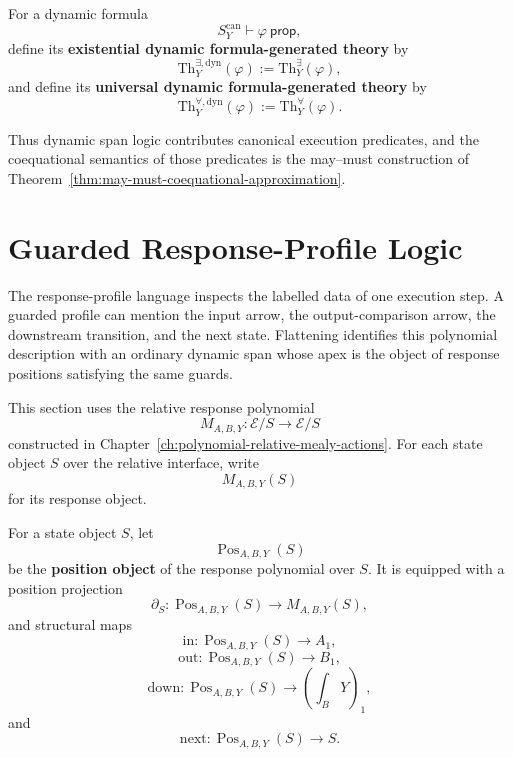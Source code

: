 \begin{definition}
\label{def:dynamic-formula-generated-theories}
For a dynamic formula
\[
  S^{\mathrm{can}}_Y\vdash\varphi\ \mathsf{prop},
\]
define its \textbf{existential dynamic formula-generated theory} by
\[
  \mathrm{Th}^{\exists,\mathrm{dyn}}_Y(\varphi)
  :=
  \mathrm{Th}^{\exists}_Y(\varphi),
\]
and define its \textbf{universal dynamic formula-generated theory} by
\[
  \mathrm{Th}^{\forall,\mathrm{dyn}}_Y(\varphi)
  :=
  \mathrm{Th}^{\forall}_Y(\varphi).
\]
\end{definition}

Thus dynamic span logic contributes canonical execution predicates, and the
coequational semantics of those predicates is the may--must construction of
Theorem~\ref{thm:may-must-coequational-approximation}.

\section{Guarded Response-Profile Logic}
\label{sec:guarded-response-profile-logic-formal}

The response-profile language inspects the labelled data of one execution
step.  A guarded profile can mention the input arrow, the output-comparison
arrow, the downstream transition, and the next state.  Flattening identifies
this polynomial description with an ordinary dynamic span whose apex is the
object of response positions satisfying the same guards.

This section uses the relative response polynomial
\[
  M_{A,B,Y}:\mathcal E/S\to \mathcal E/S
\]
constructed in Chapter~\ref{ch:polynomial-relative-mealy-actions}.  For each
state object \(S\) over the relative interface, write
\[
  M_{A,B,Y}(S)
\]
for its response object.

\begin{definition}
\label{def:response-positions}
For a state object \(S\), let
\[
  \operatorname{Pos}_{A,B,Y}(S)
\]
be the \textbf{position object} of the response polynomial over \(S\).  It is
equipped with a position projection
\[
  \partial_S:
  \operatorname{Pos}_{A,B,Y}(S)
  \longrightarrow
  M_{A,B,Y}(S),
\]
and structural maps
\[
  \mathrm{in}:
  \operatorname{Pos}_{A,B,Y}(S)\to A_1,
\]
\[
  \mathrm{out}:
  \operatorname{Pos}_{A,B,Y}(S)\to B_1,
\]
\[
  \mathrm{down}:
  \operatorname{Pos}_{A,B,Y}(S)\to
  \left(\int_B Y\right)_1,
\]
and
\[
  \mathrm{next}:
  \operatorname{Pos}_{A,B,Y}(S)\to S.
\]
\end{definition}

